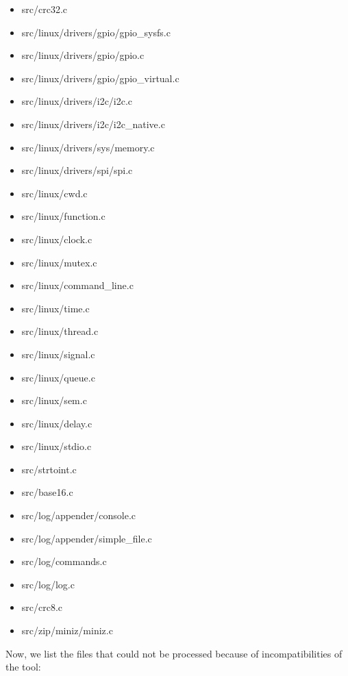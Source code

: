 \begin{itemize}
\item src/crc32.c
\item src/linux/drivers/gpio/gpio\_sysfs.c
\item src/linux/drivers/gpio/gpio.c
\item src/linux/drivers/gpio/gpio\_virtual.c
\item src/linux/drivers/i2c/i2c.c
\item src/linux/drivers/i2c/i2c\_native.c
\item src/linux/drivers/sys/memory.c
\item src/linux/drivers/spi/spi.c
\item src/linux/cwd.c
\item src/linux/function.c
\item src/linux/clock.c
\item src/linux/mutex.c
\item src/linux/command\_line.c
\item src/linux/time.c
\item src/linux/thread.c
\item src/linux/signal.c
\item src/linux/queue.c
\item src/linux/sem.c
\item src/linux/delay.c
\item src/linux/stdio.c
\item src/strtoint.c
\item src/base16.c
\item src/log/appender/console.c
\item src/log/appender/simple\_file.c
\item src/log/commands.c
\item src/log/log.c
\item src/crc8.c
\item src/zip/miniz/miniz.c
\end{itemize}

Now, we list the files that could not be processed because of incompatibilities of the tool:

